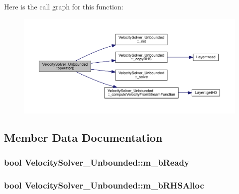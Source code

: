 Here is the call graph for this function\+:\nopagebreak
\begin{figure}[H]
\begin{center}
\leavevmode
\includegraphics[width=350pt]{da/d4b/class_velocity_solver___unbounded_a55beef939974ec2b79e869a403245534_cgraph}
\end{center}
\end{figure}




\subsection{Member Data Documentation}
\hypertarget{class_velocity_solver___unbounded_ab4e11619c97d2ebfe551bed262118ab9}{}
\subsubsection[{m\+\_\+b\+Ready}]{\setlength{\rightskip}{0pt plus 5cm}bool Velocity\+Solver\+\_\+\+Unbounded\+::m\+\_\+b\+Ready\hspace{0.3cm}{\ttfamily [protected]}}\label{class_velocity_solver___unbounded_ab4e11619c97d2ebfe551bed262118ab9}
\hypertarget{class_velocity_solver___unbounded_a83aaa5f4615df58cfe939d661075f959}{}
\subsubsection[{m\+\_\+b\+R\+H\+S\+Alloc}]{\setlength{\rightskip}{0pt plus 5cm}bool Velocity\+Solver\+\_\+\+Unbounded\+::m\+\_\+b\+R\+H\+S\+Alloc\hspace{0.3cm}{\ttfamily [protected]}}\label{class_velocity_solver___unbounded_a83aaa5f4615df58cfe939d661075f959}
\hypertarget{class_velocity_solver___unbounded_a11158418be011c0978f050fd74a04482}{}
